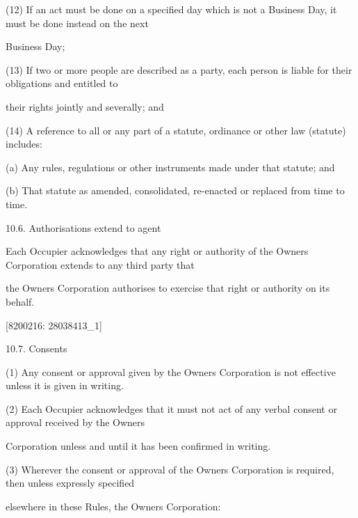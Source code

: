 \documentclass{article}
\begin{document}
{\fontsize{9.962}{1}(12) If an act must be done on a specified day which is not a Business Day, it must be done instead on the next }

{\fontsize{10.02}{1}Business Day; }

{\fontsize{9.962}{1}(13) If two or more people are described as a party, each person is liable for their obligations and entitled to }

{\fontsize{10.02}{1}their rights jointly and severally; and }

{\fontsize{9.962}{1}(14) A reference to all or any part of a statute, ordinance or other law (statute) includes: }

{\fontsize{9.962}{1}(a) Any rules, regulations or other instruments made under that statute; and }

{\fontsize{9.962}{1}(b) That statute as amended, consolidated, re-enacted or replaced from time to time. }

{\fontsize{9.99}{1}10.6. Authorisations extend to agent }

{\fontsize{10.02}{1}Each Occupier acknowledges that any right or authority of the Owners Corporation extends to any third party that }

{\fontsize{10.02}{1}the Owners Corporation authorises to exercise that right or authority on its behalf. }

\newpage
















{\fontsize{7.02}{1}[8200216: 28038413\_1] }

{\fontsize{9.99}{1}10.7. Consents }

{\fontsize{9.962}{1}(1) Any consent or approval given by the Owners Corporation is not effective unless it is given in writing. }


{\fontsize{9.962}{1}(2) Each Occupier acknowledges that it must not act of any verbal consent or approval received by the Owners }

{\fontsize{10.02}{1}Corporation unless and until it has been confirmed in writing. }

{\fontsize{9.962}{1}(3) Wherever the consent or approval of the Owners Corporation is required, then unless expressly specified }

{\fontsize{10.02}{1}elsewhere in these Rules, the Owners Corporation: }
\end{document}
